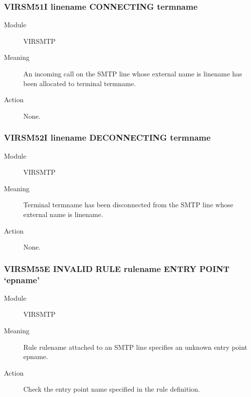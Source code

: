 \documentclass[letterpaper,10pt,english]{sphinxmanual}
\begin{document}
\subsubsection{VIRSM51I linename CONNECTING termname}
\label{\detokenize{messages:virsm51i-linename-connecting-termname}}\begin{description}
\item[{Module}] \leavevmode
VIRSMTP

\item[{Meaning}] \leavevmode
An incoming call on the SMTP line whose external name is linename has been allocated to terminal termname.

\item[{Action}] \leavevmode
None.

\end{description}


\subsubsection{VIRSM52I linename DECONNECTING termname}
\label{\detokenize{messages:virsm52i-linename-deconnecting-termname}}\begin{description}
\item[{Module}] \leavevmode
VIRSMTP

\item[{Meaning}] \leavevmode
Terminal termname has been disconnected from the SMTP line whose external name is linename.

\item[{Action}] \leavevmode
None.

\end{description}


\subsubsection{VIRSM55E INVALID RULE rulename ENTRY POINT ‘epname’}
\label{\detokenize{messages:virsm55e-invalid-rule-rulename-entry-point-epname}}\begin{description}
\item[{Module}] \leavevmode
VIRSMTP

\item[{Meaning}] \leavevmode
Rule rulename attached to an SMTP line specifies an unknown entry point epname.

\item[{Action}] \leavevmode
Check the entry point name specified in the rule definition.

\end{description}
\end{document}
